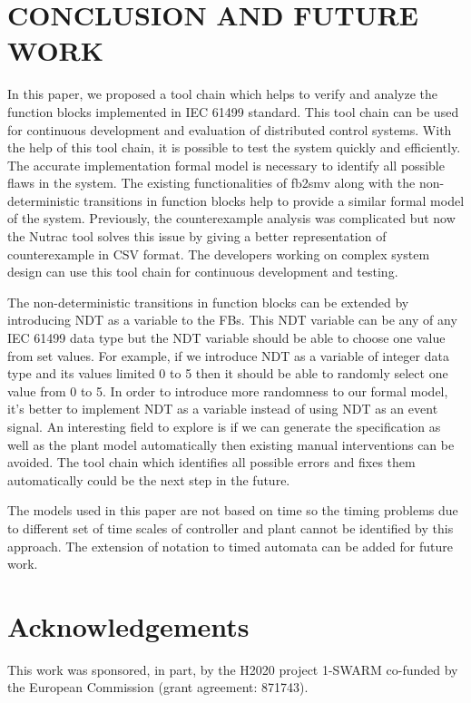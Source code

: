 \begin{bibunit}
\section{CONCLUSION AND FUTURE WORK}


In this paper, we proposed a tool chain which helps to verify and analyze the function blocks implemented in IEC 61499 standard.  This tool chain can be used for continuous development and evaluation of distributed control systems.  With the help of this tool chain,  it is possible to test the system quickly and efficiently. The accurate implementation formal model is necessary to identify all possible flaws in the system.  The existing functionalities of fb2smv along with the non-deterministic transitions in function blocks help to provide a similar formal model of the system.  Previously, the counterexample  analysis was complicated but now the Nutrac tool solves this issue by giving  a better representation of counterexample in CSV format. The developers working on complex system design can use this tool chain for continuous development and testing.


The non-deterministic transitions  in function blocks can be extended by introducing NDT as a variable to the FBs. This NDT variable can be any of any IEC 61499 data type but the NDT variable should be able to choose one value from set values.  For example, if we introduce NDT as a variable of integer data type and its values  limited 0 to 5 then it should be able to randomly select one value from 0 to 5.  In order to introduce more randomness to our formal model, it's better to implement NDT as a variable instead of using NDT as an event signal.  An interesting field to explore is if we can generate  the specification as well as the plant model automatically then existing manual interventions can be avoided. The tool chain which identifies all possible errors and fixes them automatically could be the next step in the future.

The models used in this paper are not based on time so the timing problems due to different set of time scales of controller and plant cannot be identified by this approach. The extension of notation to timed automata can be added for future work.

\section{Acknowledgements}
This work was sponsored, in part, by the H2020 project 1-SWARM co-funded by the European Commission (grant agreement: 871743).  

\putbib
\end{bibunit}
